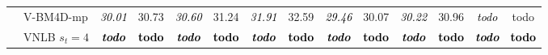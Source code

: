 \documentclass[10pt, journal, twocolumn, final, a4paper]{IEEEtran}
\newcommand{\best}[1]{#1}
\newcommand{\bsic}[1]{\textcolor{black}{\textit{#1}}}
\newcommand{\Bsic}[1]{\textcolor{black}{\textbf{\textit{#1}}}}
\newcommand{\Best}[1]{\textbf{\textcolor{black}{#1}}}
\begin{document}
\begin{table}[htp!]
\begin{center}
{\begin{tabular}{ c | l |c c | c c | c c | c c | c c | c c}
			                      & V-BM4D-mp            & \bsic{30.01} &       30.73  & \bsic{30.60} &       31.24  & \bsic{31.91} &       32.59  & \bsic{29.46} &       30.07  & \bsic{30.22} &       30.96  & \bsic{todo } &       todo   \\
			                      & VNLB   $s_t = 4$     & \Bsic{todo } & \Best{todo } & \Bsic{todo } & \Best{todo } & \Bsic{todo } & \Best{todo } & \Bsic{todo } & \Best{todo } & \Bsic{todo } & \Best{todo } & \Bsic{todo } & \Best{todo } \\\hline
%                                                                                                                                                                                                                                         

\end{tabular}}
\end{center}
\end{table}
\end{document}
